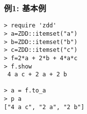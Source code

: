\subsubsection*{例1: 基本例}



\begin{Verbatim}[baselinestretch=0.7,frame=single]
> require 'zdd'
> a=ZDD::itemset("a")
> b=ZDD::itemset("b")
> c=ZDD::itemset("c")
> f=2*a + 2*b + 4*a*c
> f.show
 4 a c + 2 a + 2 b

> a = f.to_a
> p a
["4 a c", "2 a", "2 b"]
\end{Verbatim}
